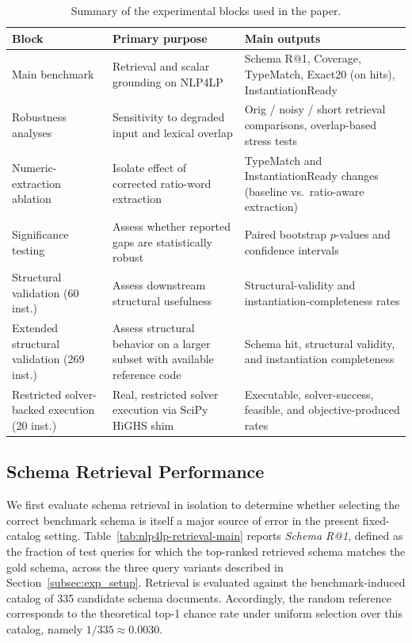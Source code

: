 \documentclass[pdflatex,sn-basic,Numbered]{sn-jnl}
\begin{document}
\begin{table}[t]
\centering
\caption{Summary of the experimental blocks used in the paper.}
\label{tab:exp_blocks}
\small
\begin{tabularx}{\linewidth}{X X X}
\toprule
Block & Primary purpose & Main outputs \\
\midrule
Main benchmark & Retrieval and scalar grounding on \textsc{NLP4LP} & Schema R@1, Coverage, TypeMatch, Exact20 (on hits), InstantiationReady \\
Robustness analyses & Sensitivity to degraded input and lexical overlap & Orig / noisy / short retrieval comparisons, overlap-based stress tests \\
Numeric-extraction ablation & Isolate effect of corrected ratio-word extraction & TypeMatch and InstantiationReady changes (baseline vs.\ ratio-aware extraction) \\
Significance testing & Assess whether reported gaps are statistically robust & Paired bootstrap $p$-values and confidence intervals \\
Structural validation (60 inst.) & Assess downstream structural usefulness & Structural-validity and instantiation-completeness rates \\
Extended structural validation (269 inst.) & Assess structural behavior on a larger subset with available reference code & Schema hit, structural validity, and instantiation completeness \\
Restricted solver-backed execution (20 inst.) & Real, restricted solver execution via SciPy HiGHS shim & Executable, solver-success, feasible, and objective-produced rates \\
\bottomrule
\end{tabularx}
\end{table}

\subsection{Schema Retrieval Performance}
\label{subsec:exp_retrieval}

We first evaluate schema retrieval in isolation to determine whether selecting the correct benchmark schema is itself a major source of error in the present fixed-catalog setting. Table~\ref{tab:nlp4lp-retrieval-main} reports \textit{Schema R@1}, defined as the fraction of test queries for which the top-ranked retrieved schema matches the gold schema, across the three query variants described in Section~\ref{subsec:exp_setup}. Retrieval is evaluated against the benchmark-induced catalog of 335 candidate schema documents. Accordingly, the random reference corresponds to the theoretical top-1 chance rate under uniform selection over this catalog, namely $1/335 \approx 0.0030$.
\end{document}
